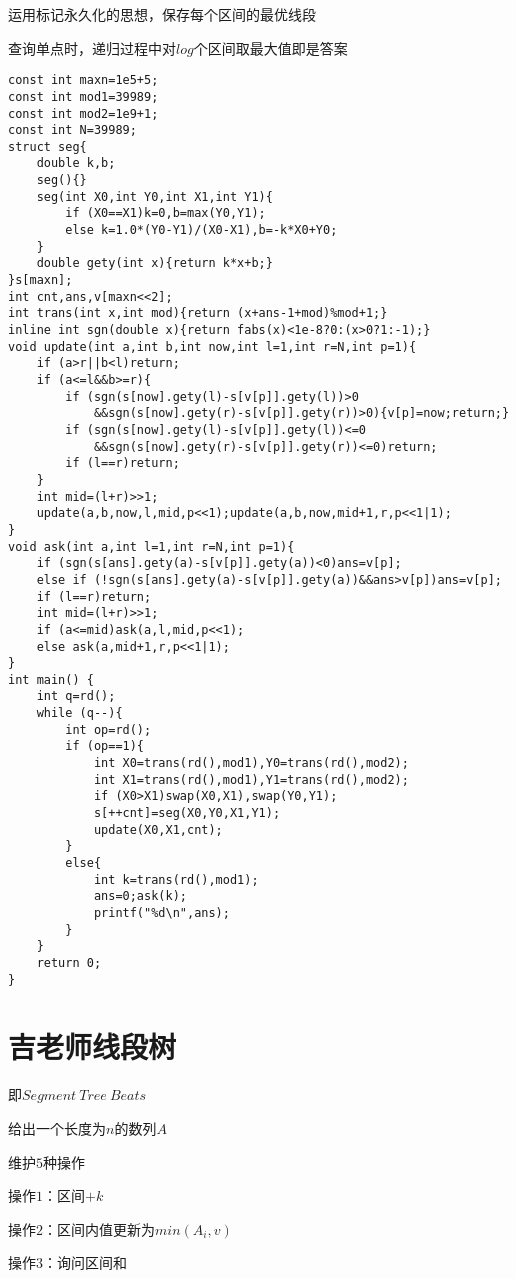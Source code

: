 \documentclass[12pt]{article}
\begin{document}
{{{{{{{{{{{{运用标记永久化的思想，保存每个区间的最优线段

查询单点时，递归过程中对$log$个区间取最大值即是答案

{\setmainfont{Consolas}
\begin{lstlisting}
const int maxn=1e5+5;
const int mod1=39989;
const int mod2=1e9+1;
const int N=39989;
struct seg{
    double k,b;
    seg(){}
    seg(int X0,int Y0,int X1,int Y1){
        if (X0==X1)k=0,b=max(Y0,Y1);
        else k=1.0*(Y0-Y1)/(X0-X1),b=-k*X0+Y0;
    }
    double gety(int x){return k*x+b;}
}s[maxn];
int cnt,ans,v[maxn<<2];
int trans(int x,int mod){return (x+ans-1+mod)%mod+1;}
inline int sgn(double x){return fabs(x)<1e-8?0:(x>0?1:-1);}
void update(int a,int b,int now,int l=1,int r=N,int p=1){
    if (a>r||b<l)return;
    if (a<=l&&b>=r){
        if (sgn(s[now].gety(l)-s[v[p]].gety(l))>0
            &&sgn(s[now].gety(r)-s[v[p]].gety(r))>0){v[p]=now;return;}
        if (sgn(s[now].gety(l)-s[v[p]].gety(l))<=0
            &&sgn(s[now].gety(r)-s[v[p]].gety(r))<=0)return;
        if (l==r)return;
    }
    int mid=(l+r)>>1;
    update(a,b,now,l,mid,p<<1);update(a,b,now,mid+1,r,p<<1|1);
}
void ask(int a,int l=1,int r=N,int p=1){
    if (sgn(s[ans].gety(a)-s[v[p]].gety(a))<0)ans=v[p];
    else if (!sgn(s[ans].gety(a)-s[v[p]].gety(a))&&ans>v[p])ans=v[p];
    if (l==r)return;
    int mid=(l+r)>>1;
    if (a<=mid)ask(a,l,mid,p<<1);
    else ask(a,mid+1,r,p<<1|1);
}
int main() {
    int q=rd();
    while (q--){
        int op=rd();
        if (op==1){
            int X0=trans(rd(),mod1),Y0=trans(rd(),mod2);
            int X1=trans(rd(),mod1),Y1=trans(rd(),mod2);
            if (X0>X1)swap(X0,X1),swap(Y0,Y1);
            s[++cnt]=seg(X0,Y0,X1,Y1);
            update(X0,X1,cnt);
        }
        else{
            int k=trans(rd(),mod1);
            ans=0;ask(k);
            printf("%d\n",ans);
        }
    }
    return 0;
}
\end{lstlisting}



\section{吉老师线段树}

即$Segment\ Tree\ Beats$

给出一个长度为$n$的数列$A$

维护$5$种操作

操作$1$：区间$+k$

操作$2$：区间内值更新为$min(A_i,v)$

操作$3$：询问区间和

}}}}}}}}}}}}}
\end{document}
